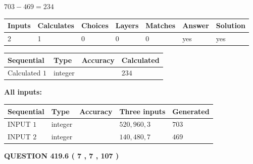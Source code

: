 \documentclass{ctexart}
\begin{document}
 

$ %
703 -  %
469=   %
234$
 
 
\noindent{}
 
 

 
   
   
   
   
\noindent\begin{tabular}{|l|l|l|l|l|l|l|}
 \hline
Inputs & Calculates & Choices & Layers & Matches & Answer & Solution \\ \hline
 2  & 
 1  & 
 0
  & 
 0  & 
 0  & 
  yes & 
  yes 
  \\ \hline
 \end{tabular}
   
   
   
   
\noindent{}
   
   
  
  
\noindent\begin{tabular}{|l|l|l|l|}
\hline
 Sequential & Type & Accuracy & Calculated \\ 
\hline
 
 
  Calculated $  1 $ & integer &  & 
  $ 234 $ 
 \\  \hline  
 \end{tabular}
   
   
   
   
\noindent\vspace{0.1in}\hspace{-0.08in} {\textbf{\Large{All inputs: }}}
   
   
  
  
\noindent\begin{tabular}{|l|l|l|l|l|}
\hline
 Sequential & Type & Accuracy & Three inputs & Generated \\ 
\hline
 
 
  INPUT $  1 $ & integer &  & $
 520
 , 
 960
 , 
 3
 $ & $ 703 $ 
 \\  \hline  
 
 
  INPUT $  2 $ & integer &  & $
 140
 , 
 480
 , 
 7
 $ & $ 469 $ 
 \\  \hline  
 \end{tabular}
   
   
  
\vspace{0.2in}
  
{\textbf{\Large{QUESTION
419.6 
 ( 7 , 7 , 107 )
}}}
  
\end{document}
